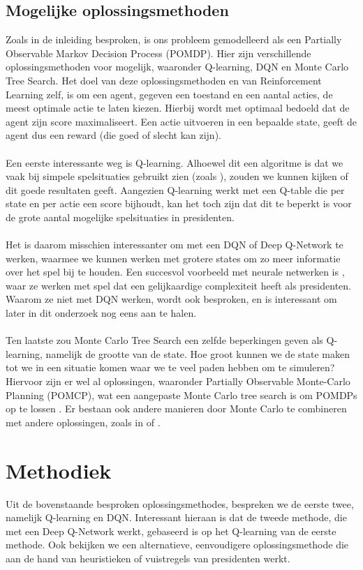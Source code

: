 \documentclass[11pt]{article}
\begin{document}
\subsection{Mogelijke oplossingsmethoden}
Zoals in de inleiding besproken, is ons probleem gemodelleerd als  een Partially Observable Markov Decision Process (POMDP). Hier zijn verschillende oplossingsmethoden voor mogelijk, waaronder Q-learning, DQN en Monte Carlo Tree Search. Het doel van deze oplossingsmethoden en van Reinforcement Learning zelf, is om een agent, gegeven een toestand en een aantal acties, de meest optimale actie te laten kiezen. Hierbij wordt met optimaal bedoeld dat de agent zijn score maximaliseert. Een actie uitvoeren in een bepaalde state, geeft de agent dus een reward (die goed of slecht kan zijn).\\\\ 
Een eerste interessante weg is Q-learning. Alhoewel dit een algoritme is dat we vaak bij simpele spelsituaties gebruikt zien (zoals \cite{simple-qlearning}), zouden we kunnen kijken of dit goede resultaten geeft. Aangezien Q-learning werkt met een Q-table die per state en per actie een score bijhoudt, kan het toch zijn dat dit te beperkt is voor de grote aantal mogelijke spelsituaties in presidenten. \\\\
Het is daarom misschien interessanter om met een DQN of Deep Q-Network te werken, waarmee we kunnen werken met grotere states om zo meer informatie over het spel bij te houden. Een succesvol voorbeeld met neurale netwerken is \cite{nn-paper}, waar ze werken met spel dat een gelijkaardige complexiteit heeft als presidenten. Waarom ze niet met DQN werken, wordt ook besproken, en is interessant om later in dit onderzoek nog eens aan te halen. \\\\
Ten laatste zou Monte Carlo Tree Search een zelfde beperkingen geven als Q-learning, namelijk de grootte van de state. Hoe groot kunnen we de state maken tot we in een situatie komen waar we te veel paden hebben om te simuleren? Hiervoor zijn er wel al oplossingen, waaronder Partially Observable Monte-Carlo Planning (POMCP), wat een aangepaste Monte Carlo tree search is om POMDPs op te lossen \cite{mct-1}. Er bestaan ook andere manieren door Monte Carlo te combineren met andere oplossingen, zoals in \cite{mct-2} of \cite{mct-3}.\\

\section{Methodiek}
Uit de bovenstaande besproken oplossingsmethodes, bespreken we de eerste twee, namelijk Q-learning en DQN. Interessant hieraan is dat de tweede methode, die met een Deep Q-Network werkt, gebaseerd is op het Q-learning van de eerste methode. Ook bekijken we een alternatieve, eenvoudigere oplossingsmethode die aan de hand van heuristieken of vuistregels van presidenten werkt.\\
\end{document}
